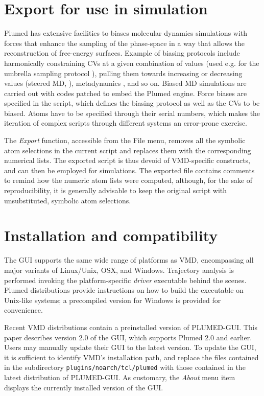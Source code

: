 \documentclass[preprint,review,11pt]{elsarticle}
\begin{document}
\section{Export for use in simulation}\label{sec:export-use-simul}

Plumed has extensive facilities to biases molecular dynamics
simulations with forces that enhance the sampling of the phase-space
in a way that allows the reconstruction of free-energy
surfaces. Example of biasing protocols include harmonically
constraining CVs at a given combination of values (used e.g. for the
umbrella sampling protocol \cite{Torrie_Valleau_1977}), pulling them
towards increasing or decreasing values (steered MD,
\cite{Isralewitz_Gao_Schulten_2001,Giorgino_2011}), metadynamics
\cite{Laio_Parrinello_2002}, and so on. Biased MD simulations are
carried out with codes patched to embed the Plumed engine. Force
biases are specified in the script, which defines the biasing protocol
as well as the CVs to be biased.  Atoms have to be specified
through their serial numbers, which makes the iteration of complex
scripts through different systems an error-prone exercise.

The \emph{Export} function, accessible from the File menu, removes all
the symbolic atom selections in the current script and replaces them
with the corresponding numerical lists. The exported script is thus
devoid of VMD-specific constructs, and can then be employed for
simulations.  The exported file contains comments to remind how the
numeric atom lists were computed, although, for the sake of
reproducibility, it is generally advisable to keep the original
script with unsubstituted, symbolic atom selections.



\section{Installation and compatibility}

The GUI supports the same wide range of platforms as VMD, encompassing
all major variants of Linux/Unix, OSX, and Windows.  Trajectory
analysis is performed invoking the platform-specific \emph{driver}
executable behind the scenes. Plumed distributions provide
instructions on how to build the executable on Unix-like systems; a
precompiled version for Windows is provided for convenience.

Recent VMD distributions contain a preinstalled version of PLUMED-GUI.
This paper describes version 2.0 of the GUI, which supports Plumed 2.0
and earlier.  Users may manually update their GUI to the latest
version.  To update the GUI, it is sufficient to identify VMD's
installation path, and replace the files contained in the subdirectory
\texttt{plugins/noarch/tcl/plumed} with those contained in the latest
distribution of PLUMED-GUI.  As customary, the \emph{About} menu item
displays the currently installed version of the GUI.
\end{document}
